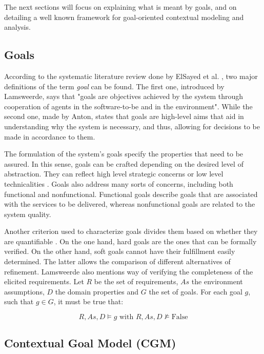 The next sections will focus on explaining what is meant by goals, and on detailing a well known framework for goal-oriented contextual modeling and analysis.

\subsection{Goals}

According to the systematic literature review done by ElSayed et al. \cite{ElSayed2017430}, two major definitions of the term \textit{goal} can be found. The first one, introduced by Lamsweerde, says that "goals are objectives achieved by the system through cooperation of agents in the software-to-be and in the environment". While the second one, made by Anton, states that goals are high-level aims that aid in understanding why the system is necessary, and thus, allowing for decisions to be made in accordance to them. 

The formulation of the system's goals specify the properties that need to be assured. In this sense, goals can be crafted depending on the desired level of abstraction. They can reflect high level strategic concerns or low level technicalities \cite{2001Lamsweerde}. Goals also address many sorts of concerns, including both functional and nonfunctional. Functional goals describe goals that are associated with the services to be delivered, whereas nonfunctional goals are related to the system quality. 

Another criterion used to characterize goals divides them based on whether they are quantifiable \cite{ElSayed2017430}. On the one hand, hard goals are the ones that can be formally verified. On the other hand, soft goals cannot have their fulfillment easily determined. The latter allows the comparison of different alternatives of refinement. 
Lamsweerde also mentions way of verifying the completeness of the elicited requirements. Let \(R\) be the set of requirements, \(As\) the environment assumptions, \(D\) the domain properties and \(G\) the set of goals. For each goal \(g\), such that \(g \in G\), it must be true that: 

\[R, As, D \vDash g \text{ with } R, As, D \nvDash \text{False}\]

\subsection{Contextual Goal Model (CGM)}

